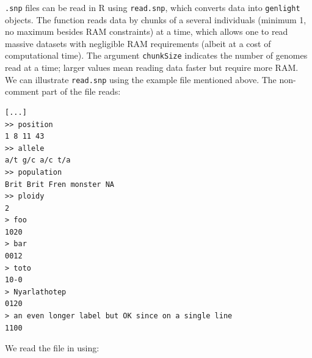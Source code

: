\documentclass{article}
\begin{document}
\texttt{.snp} files can be read in R using \texttt{read.snp}, which converts data into
\texttt{genlight} objects.
The function reads data by chunks of a several individuals (minimum 1, no maximum besides RAM
constraints) at a time, which allows one to read massive datasets with negligible RAM requirements
(albeit at a cost of computational time). The argument \texttt{chunkSize} indicates the number of
genomes read at a time; larger values mean reading data faster but require more RAM.
We can illustrate \texttt{read.snp} using the example file mentioned above.
The non-comment part of the file reads:
\begin{verbatim}
[...]
>> position
1 8 11 43
>> allele
a/t g/c a/c t/a
>> population
Brit Brit Fren monster NA
>> ploidy
2
> foo
1020
> bar
0012
> toto
10-0
> Nyarlathotep
0120
> an even longer label but OK since on a single line
1100
\end{verbatim}
We read the file in using:
\end{document}
